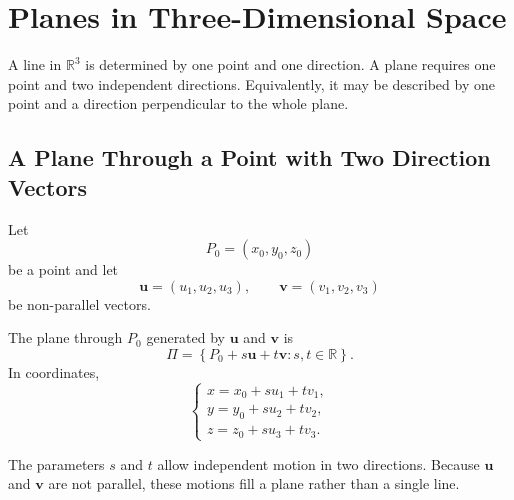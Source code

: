 \section{Planes in Three-Dimensional Space}

A line in $\mathbb{R}^3$ is determined by one point and one direction. A plane
requires one point and two independent directions. Equivalently, it may be
described by one point and a direction perpendicular to the whole plane.

\subsection{A Plane Through a Point with Two Direction Vectors}

Let
\[
P_0=(x_0,y_0,z_0)
\]
be a point and let
\[
\mathbf{u}=(u_1,u_2,u_3),
\qquad
\mathbf{v}=(v_1,v_2,v_3)
\]
be non-parallel vectors.

\begin{definitionbox}
The plane through $P_0$ generated by $\mathbf{u}$ and $\mathbf{v}$ is
\[
\Pi
=
\left\{
P_0+s\mathbf{u}+t\mathbf{v}:s,t\in\mathbb{R}
\right\}.
\]
In coordinates,
\[
\begin{cases}
x=x_0+s u_1+t v_1,\\
y=y_0+s u_2+t v_2,\\
z=z_0+s u_3+t v_3.
\end{cases}
\]
\end{definitionbox}

The parameters $s$ and $t$ allow independent motion in two directions. Because
$\mathbf{u}$ and $\mathbf{v}$ are not parallel, these motions fill a plane rather
than a single line.

\begin{center}
\end{center}

